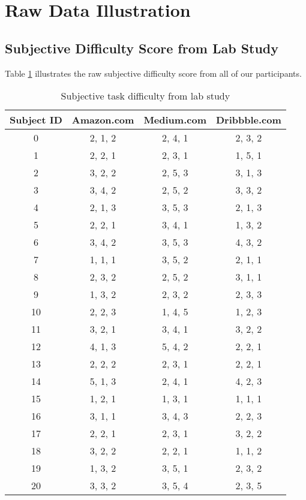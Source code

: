 \section{Raw Data Illustration}
\label{appendix:c}

\subsection{Subjective Difficulty Score from Lab Study}

Table \ref{table:diff-raw} illustrates the raw subjective difficulty score from all of our 
participants.

\begin{table}[H]
      \small
      \centering
      \setlength{\belowcaptionskip}{10pt}
      \caption{Subjective task difficulty from lab study}

      \begin{tabular}{cccc}
            \toprule
            \textbf{Subject ID} & \textbf{Amazon.com} & \textbf{Medium.com} & \textbf{Dribbble.com} \\
            \hline
            0 & 2, 1, 2 & 2, 4, 1 & 2, 3, 2 \\
            1 & 2, 2, 1 & 2, 3, 1 & 1, 5, 1 \\
            2 & 3, 2, 2 & 2, 5, 3 & 3, 1, 3 \\
            3 & 3, 4, 2 & 2, 5, 2 & 3, 3, 2 \\
            4 & 2, 1, 3 & 3, 5, 3 & 2, 1, 3 \\
            5 & 2, 2, 1 & 3, 4, 1 & 1, 3, 2 \\
            6 & 3, 4, 2 & 3, 5, 3 & 4, 3, 2 \\
            7 & 1, 1, 1 & 3, 5, 2 & 2, 1, 1 \\
            8 & 2, 3, 2 & 2, 5, 2 & 3, 1, 1 \\
            9 & 1, 3, 2 & 2, 3, 2 & 2, 3, 3 \\
            10 & 2, 2, 3 & 1, 4, 5 & 1, 2, 3 \\
            11 & 3, 2, 1 & 3, 4, 1 & 3, 2, 2 \\
            12 & 4, 1, 3 & 5, 4, 2 & 2, 2, 1 \\
            13 & 2, 2, 2 & 2, 3, 1 & 2, 2, 1 \\
            14 & 5, 1, 3 & 2, 4, 1 & 4, 2, 3 \\
            15 & 1, 2, 1 & 1, 3, 1 & 1, 1, 1 \\
            16 & 3, 1, 1 & 3, 4, 3 & 2, 2, 3 \\
            17 & 2, 2, 1 & 2, 3, 1 & 3, 2, 2 \\
            18 & 3, 2, 2 & 2, 2, 1 & 1, 1, 2 \\
            19 & 1, 3, 2 & 3, 5, 1 & 2, 3, 2 \\
            20 & 3, 3, 2 & 3, 5, 4 & 2, 3, 5 \\
            \bottomrule
      \end{tabular}
      \label{table:diff-raw}
\end{table}

